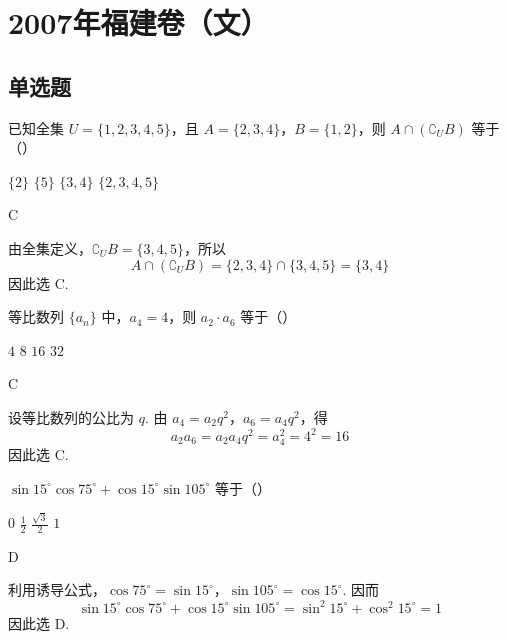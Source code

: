 \chapter{2007年福建卷（文）}

\section{单选题}

\begin{problem}
已知全集 \(U = \{1, 2, 3, 4, 5\}\)，且 \(A = \{2, 3, 4\}\)，\(B = \{1, 2\}\)，则 \(A \cap \left( \complement_U B \right)\) 等于（\quad）

\choices
    {\(\{2\}\)}
    {\(\{5\}\)}
    {\(\{3, 4\}\)}
    {\(\{2, 3, 4, 5\}\)}
\end{problem}

\begin{answer}
C
\end{answer}

\begin{solution}
由全集定义，\(\complement_U B=\{3,4,5\}\)，所以
\[
A\cap\left(\complement_U B\right)=\{2,3,4\}\cap\{3,4,5\}=\{3,4\}
\]
因此选 C.
\end{solution}

\begin{problem}
等比数列 \(\{a_n\}\) 中，\(a_4 = 4\)，则 \(a_2 \cdot a_6\) 等于（\quad）

\choices
    {\(4\)}
    {\(8\)}
    {\(16\)}
    {\(32\)}
\end{problem}

\begin{answer}
C
\end{answer}

\begin{solution}
设等比数列的公比为 \(q\). 由 \(a_4=a_2q^2\)，\(a_6=a_4q^2\)，得
\[
a_2a_6=a_2a_4q^2=a_4^2=4^2=16
\]
因此选 C.
\end{solution}

\begin{problem}
\(\sin 15^\circ \cos 75^\circ + \cos 15^\circ \sin 105^\circ\) 等于（\quad）

\choices
    {\(0\)}
    {\(\frac{1}{2}\)}
    {\(\frac{\sqrt{3}}{2}\)}
    {\(1\)}
\end{problem}

\begin{answer}
D
\end{answer}

\begin{solution}
利用诱导公式，\(\cos75^\circ=\sin15^\circ\)，\(\sin105^\circ=\cos15^\circ\). 因而
\[
\sin15^\circ\cos75^\circ+\cos15^\circ\sin105^\circ
=\sin^2 15^\circ+\cos^2 15^\circ=1
\]
因此选 D.
\end{solution}

